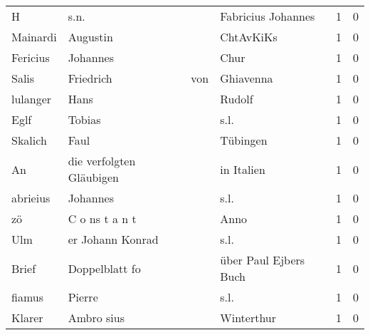 \begin{tabular}{llllrr}
                        H &                               s.n. &             &                          Fabricius Johannes &          1 &         0 \\
                 Mainardi &                           Augustin &             &                                   ChtAvKiKs &          1 &         0 \\
                 Fericius &                           Johannes &             &                                        Chur &          1 &         0 \\
                    Salis &                          Friedrich &         von &                                   Ghiavenna &          1 &         0 \\
                 lulanger &                               Hans &             &                                      Rudolf &          1 &         0 \\
                     Eglf &                             Tobias &             &                                        s.l. &          1 &         0 \\
                  Skalich &                               Faul &             &                                    Tübingen &          1 &         0 \\
                       An &           die verfolgten Gläubigen &             &                                  in Italien &          1 &         0 \\
                 abrieius &                           Johannes &             &                                        s.l. &          1 &         0 \\
                       zö &                     C o ns t a n t &             &                                        Anno &          1 &         0 \\
                      Ulm &                   er Johann Konrad &             &                                        s.l. &          1 &         0 \\
                    Brief &                     Doppelblatt fo &             &                       über Paul Ejbers Buch &          1 &         0 \\
                   fiamus &                             Pierre &             &                                        s.l. &          1 &         0 \\
                   Klarer &                         Ambro sius &             &                                  Winterthur &          1 &         0 \\

\end{tabular}
